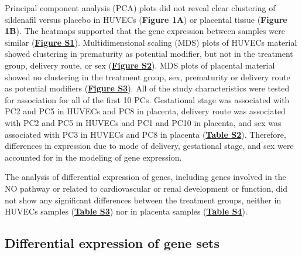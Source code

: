 \documentclass[authordate, empirical,issue]{jote-new-article}
\begin{document}
Principal component analysis (PCA) plots did not reveal clear clustering of sildenafil versus placebo in HUVECs (\textbf{Figure 1A}) or placental tissue (\textbf{Figure 1B}). The heatmaps supported that the gene expression between samples were similar (\textbf{\href{https://journal.trialanderror.org/pub/prenatal-sildenafil-pregnancies\#supplementary-materials}{Figure S1}}). Multidimensional scaling (MDS) plots of HUVECs material showed clustering in prematurity as potential modifier, but not in the treatment group, delivery route, or sex (\textbf{\href{https://journal.trialanderror.org/pub/prenatal-sildenafil-pregnancies\#supplementary-materials}{Figure S2}}). MDS plots of placental material showed no clustering in the treatment group, sex, prematurity or delivery route as potential modifiers (\textbf{\href{https://journal.trialanderror.org/pub/prenatal-sildenafil-pregnancies\#supplementary-materials}{Figure S3}}). All of the study characteristics were tested for association for all of the first 10 PCs. Gestational stage was associated with PC2 and PC5 in HUVECs and PC8 in placenta, delivery route was associated with PC2 and PC5 in HUVECs and PC1 and PC10 in placenta, and sex was associated with PC3 in HUVECs and PC8 in placenta (\textbf{\href{https://journal.trialanderror.org/pub/prenatal-sildenafil-pregnancies\#supplementary-materials}{Table S2}}). Therefore, differences in expression due to mode of delivery, gestational stage, and sex were accounted for in the modeling of gene expression.



The analysis of differential expression of genes, including genes involved in the NO pathway or related to cardiovascular or renal development or function, did not show any significant differences between the treatment groups, neither in HUVECs samples (\textbf{\href{https://journal.trialanderror.org/pub/prenatal-sildenafil-pregnancies\#supplementary-materials}{Table S3}}) nor in placenta samples (\textbf{\href{https://journal.trialanderror.org/pub/prenatal-sildenafil-pregnancies\#supplementary-materials}{Table S4}}).


\subsection{Differential expression of gene sets}
\end{document}
